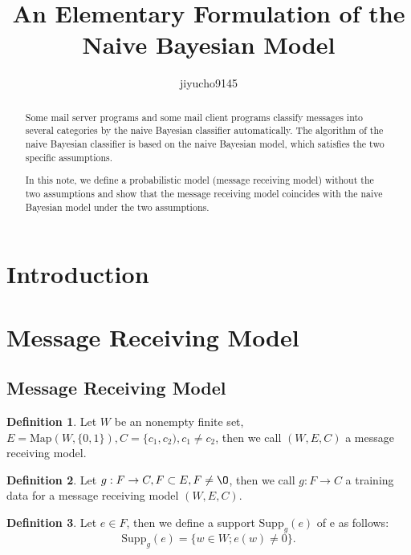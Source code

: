 \documentclass[11pt, a4note]{article}
\theoremstyle{definition}
\newtheorem{definition}{Definition}[section]
\begin{document}
\title{An Elementary Formulation of the Naive Bayesian Model}
\author{jiyucho9145}
\maketitle
\begin{abstract}
Some mail server programs and some mail client programs classify messages into several categories
by the naive Bayesian classifier automatically. The algorithm of the naive Bayesian classifier is based on
the naive Bayesian model, which satisfies the two specific assumptions.

In this note, we define a probabilistic model (message receiving model) without the two assumptions
and show that the message receiving model coincides with the naive Bayesian model under the two assumptions.
\end{abstract}

\newpage
\tableofcontents

\newpage
\section{Introduction}

\section{Message Receiving Model}

\subsection{Message Receiving Model}

\begin{definition}
Let $ W $ be an nonempty finite set, $ E = \mathrm{Map}(W, \{0, 1\}), C = \{c_{1}, c_{2}), c_{1} \ne c_{2} $,
then we call $ (W, E, C) $ a message receiving model.
\end{definition}

\begin{definition}
Let $ g : F \to C, F \subset E, F \ne \O $, then we call $ g : F \to C $ a training data for a message receiving model $ (W, E, C) $.
\end{definition}

\begin{definition}
Let $ e \in F $, then we define a support $ \mathrm{Supp}_{g}(e) $ of e as follows:
\begin{equation}
\mathrm{Supp}_{g}(e) = \{ w \in W ; e(w) \ne 0\}.
\end{equation}
\end{definition}
\end{document}

